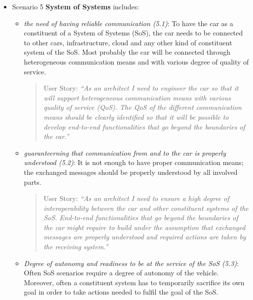 \begin{itemize}
\begin{itemize}
\begin{quote}
{User Story:} 
\emph{``As any developer of the electrical system (internal or external) I want to have quick feedback on how my contribution will work on the various levels of integration. 
As a Functional Developer, I want to have fast and defined feedback cycles. 
As a tester, I want quick updates on all levels of tests and continuous improvement of functionality.''}
\end{quote}
\end{itemize}



\item Scenario 5 {\bf System of Systems} includes:

\begin{itemize}
\item {\em the need of having reliable communication (5.1)}: To have the car as a constituent of a System of Systems (SoS), the car needs to be connected to other cars, infrastructure, cloud and any other kind of constituent system of the SoS. Most probably the car will be connected through heterogeneous communication means and with various degree of quality of service.

\begin{quote}
{User Story:} 
\emph{``As an architect I need to engineer the car so that it will support heterogeneous communication means with various quality of service (QoS). The QoS of the different communication means should be clearly identified so that it will be possible to develop end-to-end functionalities that go beyond the boundaries of the car.''}
\end{quote}

\item {\em guaranteerning that communication from and to the car is properly understood (5.2)}: It is not enough to have proper communication means; the exchanged messages should be properly understood by all involved parts.

\begin{quote}
{User Story:} 
\emph{``As an architect I need to ensure a high degree of interoperability between the car and other constituent systems of the SoS. End-to-end functionalities that go beyond the boundaries of the car might require to build under the assumption that exchanged messages are properly understood and required actions are taken by the receiving system.''}
\end{quote}

\item {\em Degree of autonomy and readiness to be at the service of the SoS (5.3)}: Often SoS scenarios require a degree of autonomy of the vehicle. Moreover, often a constituent system has to temporarily sacrifice its own goal in order to take actions needed to fulfil the goal of the SoS.


\end{itemize}
\end{itemize}
